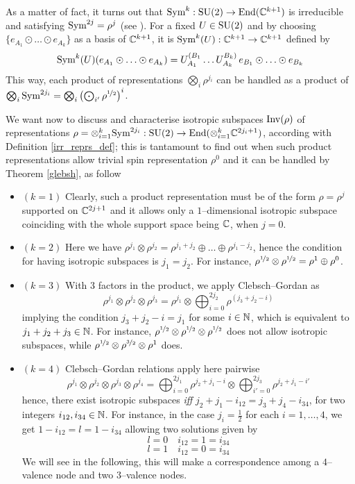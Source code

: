 {As a matter of fact, it turns out that
$\text{\normalfont Sym}^k:\text{\normalfont SU}(2)\to\text{\normalfont End}(\mathbb{C}^{k+1})$
is irreducible and satisfying $\text{\normalfont Sym}^{2j}=\rho^j$ (see \cite{LN6}). For a fixed $U\in\text{\normalfont SU}(2)$ and by choosing $\bigg\{e_{A_1}\odot\hdots\odot e_{A_k}\bigg\}$ as a basis of $\mathbb{C}^{k+1}$, it is $\text{\normalfont Sym}^k(U):\mathbb{C}^{k+1}\to\mathbb{C}^{k+1}$ defined by}
$$\text{\normalfont Sym}^k(U)(e_{A_1}\odot\hdots\odot e_{A_k})=U_{A_1}^{(B_1}\hdots U_{A_k}^{B_k)}\,e_{B_1}\odot\hdots\odot e_{B_k}
$$
{This way, each product of representations $\bigotimes_i\rho^{j_i}$ can be handled as a product of $\bigotimes_i\text{\normalfont Sym}^{2j_i}=\bigotimes_i\left(\bigodot_{i'}\rho^{\nicefrac{1}{2}}\right)^i$.}

{We want now to discuss and characterise isotropic subspaces $\text{\normalfont Inv}(\rho)$ of representations $\rho=\otimes_{i=1}^k\text{\normalfont Sym}^{2j_i}:\text{\normalfont SU}(2)\to\text{\normalfont End}(\otimes_{i=1}^k\mathbb{C}^{2j_i+1})$, according with Definition \ref{irr_reprs_def}; this is tantamount to find out when such product representations allow trivial spin representation $\rho^0$ and it can be handled by Theorem \ref{glebsh}, as follow}

\begin{itemize}
    \item $(k=1)$ Clearly, such a product representation must be of the form $\rho=\rho^j$ supported on $\mathbb{C}^{2j+1}$ and it allows only a $1$--dimensional isotropic subspace coinciding with the whole support space being $\mathbb{C}$, when $j=0$.
    \item $(k=2)$ Here we have $\rho^{j_1}\otimes\rho^{j_2}=\rho^{j_1+j_2}\oplus\hdots\oplus\rho^{j_1-j_2}$, hence the condition for having isotropic subspaces is $j_1=j_2$. For instance, $\rho^{\nicefrac{1}{2}}\otimes\rho^{\nicefrac{1}{2}}=\rho^1\oplus\rho^0$.
    \item $(k=3)$ With $3$ factors in the product, we apply Clebsch--Gordan as
    $$\rho^{j_1}\otimes\rho^{j_2}\otimes\rho^{j_3}=\rho^{j_1}\otimes\bigoplus_{i=0}^{2j_2}\rho^{(j_3+j_2-i)}$$
    implying the condition $j_3+j_2-i=j_1$ for some $i\in\mathbb{N}$, which is equivalent to $j_1+j_2+j_3\in\mathbb{N}$. For instance, $\rho^{\nicefrac{1}{2}}\otimes\rho^{\nicefrac{1}{2}}\otimes\rho^{\nicefrac{1}{2}}$ does not allow isotropic subspaces, while $\rho^{\nicefrac{1}{2}}\otimes\rho^{\nicefrac{3}{2}}\otimes\rho^{1}$ does.
    \item $(k=4)$ Clebsch--Gordan relations apply here pairwise
    $$\rho^{j_1}\otimes\rho^{j_2}\otimes\rho^{j_3}\otimes\rho^{j_4}=\bigoplus_{i=0}^{2j_1}\rho^{j_2+j_1-i}\otimes\bigoplus_{i'=0}^{2j_3}\rho^{j_2+j_1-i'}$$
    hence, there exist isotropic subspaces \emph{iff} $j_2+j_1-i_{12}=j_3+j_4-i_{34}$, for two integers $i_{12},i_{34}\in\mathbb{N}$. For instance, in the case $j_i=\frac{1}{2}$ for each $i=1,\hdots,4$, we get $1-i_{12}=l=1-i_{34}$ allowing two solutions given by
    $$l=0\quad i_{12}=1=i_{34}$$
    $$l=1\quad i_{12}=0=i_{34}$$
    We will see in the following, this will make a correspondence among a $4$--valence node and two $3$--valence nodes.
\end{itemize}


